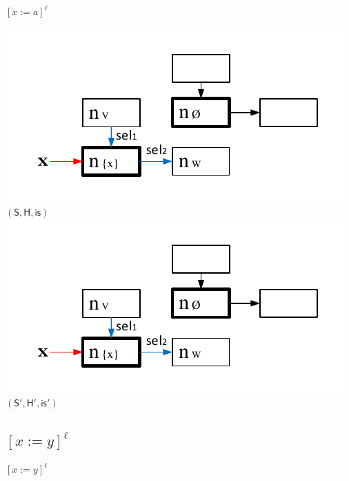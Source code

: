 \documentclass[xcolor=svgnames,11pt]{beamer}
\begin{document}
\begin{frame}[fragile]{$[x:=a]^\ell$}
\begin{center}

\includegraphics[page=1,scale=0.8]{../figures/fig5.pdf}\\
$\mathsf{(S,H,is)}$\\
\medskip
\includegraphics[page=2,scale=0.8]{../figures/fig5.pdf}\\
$\mathsf{(S',H',is')}$\\

\end{center}
\end{frame}

\subsection{$[x:=y]^\ell$}

\begin{frame}{}
\begin{center}
\begin{huge}
\textcolor{bl}{$[x:=y]^\ell$}
\end{huge}
\end{center}
\end{frame}
\end{document}
